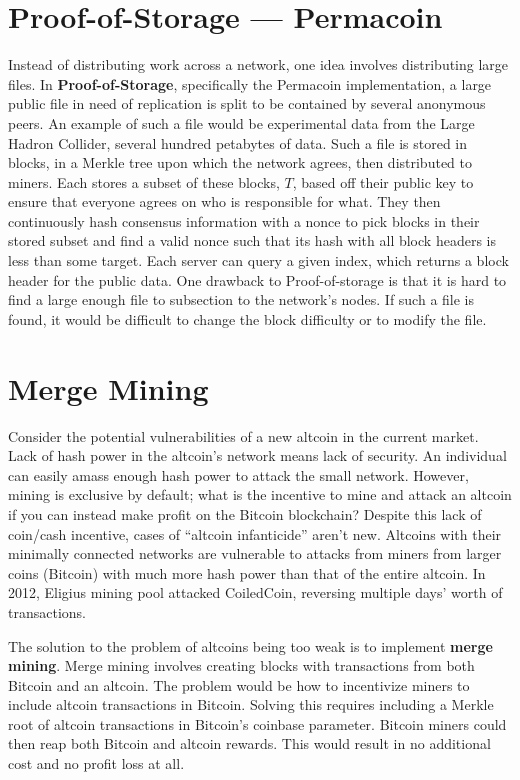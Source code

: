 \documentclass[full.tex]{subfiles}
\begin{document}
    \section*{Proof-of-Storage --- Permacoin}
    
    Instead of distributing work across a network, one idea involves distributing large files. In \textbf{Proof-of-Storage}, specifically the Permacoin implementation, a large public file in need of replication is split to be contained by several anonymous peers. An example of such a file would be experimental data from the Large Hadron Collider, several hundred petabytes of data. Such a file is stored in blocks, in a Merkle tree upon which the network agrees, then distributed to miners. Each stores a subset of these blocks, $T$, based off their public key to ensure that everyone agrees on who is responsible for what. They then continuously hash consensus information with a nonce to pick blocks in their stored subset and find a valid nonce such that its hash with all block headers is less than some target. Each server can query a given index, which returns a block header for the public data. One drawback to Proof-of-storage is that it is hard to find a large enough file to subsection to the network's nodes. If such a file is found, it would be difficult to change the block difficulty or to modify the file.
    
    \section*{Merge Mining}
    
    Consider the potential vulnerabilities of a new altcoin in the current market. Lack of hash power in the altcoin's network means lack of security. An individual can easily amass enough hash power to attack the small network. However, mining is exclusive by default; what is the incentive to mine and attack an altcoin if you can instead make profit on the Bitcoin blockchain? Despite this lack of coin/cash incentive, cases of ``altcoin infanticide'' aren't new. Altcoins with their minimally connected networks are vulnerable to attacks from miners from larger coins (Bitcoin) with much more hash power than that of the entire altcoin. In 2012, Eligius mining pool attacked CoiledCoin, reversing multiple days' worth of transactions.
    
    The solution to the problem of altcoins being too weak is to implement \textbf{merge mining}. Merge mining involves creating blocks with transactions from both Bitcoin and an altcoin. The problem would be how to incentivize miners to include altcoin transactions in Bitcoin. Solving this requires including a Merkle root of altcoin transactions in Bitcoin's coinbase parameter. Bitcoin miners could then reap both Bitcoin and altcoin rewards. This would result in no additional cost and no profit loss at all. \\
     
\end{document}

